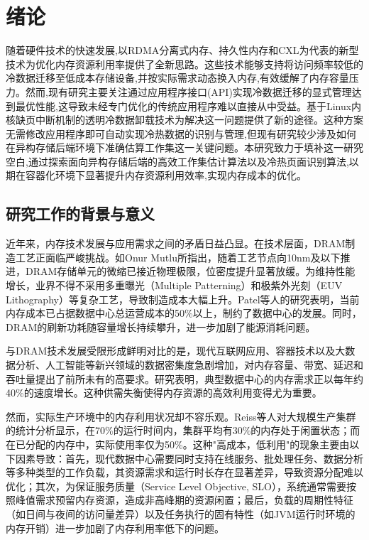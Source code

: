 \chapter{绪\hspace{6pt}论}

随着硬件技术的快速发展,以RDMA分离式内存、持久性内存和CXL为代表的新型技术为优化内存资源利用率提供了全新思路。这些技术能够支持将访问频率较低的冷数据迁移至低成本存储设备,并按实际需求动态换入内存,有效缓解了内存容量压力。然而,现有研究主要关注通过应用程序接口(API)实现冷数据迁移的显式管理达到最优性能,这导致未经专门优化的传统应用程序难以直接从中受益。基于Linux内核缺页中断机制的透明冷数据卸载技术为解决这一问题提供了新的途径。这种方案无需修改应用程序即可自动实现冷热数据的识别与管理,但现有研究较少涉及如何在异构存储后端环境下准确估算工作集这一关键问题。本研究致力于填补这一研究空白,通过探索面向异构存储后端的高效工作集估计算法以及冷热页面识别算法,以期在容器化环境下显著提升内存资源利用效率,实现内存成本的优化。

\section{研究工作的背景与意义}

近年来，内存技术发展与应用需求之间的矛盾日益凸显。在技术层面，DRAM制造工艺正面临严峻挑战。如Onur Mutlu所指出，随着工艺节点向10nm及以下推进，DRAM存储单元的微缩已接近物理极限，位密度提升显著放缓。为维持性能增长，业界不得不采用多重曝光（Multiple Patterning）和极紫外光刻（EUV Lithography）等复杂工艺，导致制造成本大幅上升。Patel等人的研究表明，当前内存成本已占据数据中心总运营成本的50\%以上，制约了数据中心的发展。同时，DRAM的刷新功耗随容量增长持续攀升，进一步加剧了能源消耗问题。

与DRAM技术发展受限形成鲜明对比的是，现代互联网应用、容器技术以及大数据分析、人工智能等新兴领域的数据密集度急剧增加，对内存容量、带宽、延迟和吞吐量提出了前所未有的高要求。研究表明，典型数据中心的内存需求正以每年约40\%的速度增长。这种供需失衡使得内存资源的高效利用变得尤为重要。

然而，实际生产环境中的内存利用状况却不容乐观。Reiss等人对大规模生产集群的统计分析显示，在70\%的运行时间内，集群平均有30\%的内存处于闲置状态；而在已分配的内存中，实际使用率仅为50\%。这种"高成本，低利用"的现象主要由以下因素导致：首先，现代数据中心需要同时支持在线服务、批处理任务、数据分析等多种类型的工作负载，其资源需求和运行时长存在显著差异，导致资源分配难以优化；其次，为保证服务质量（Service Level Objective, SLO），系统通常需要按照峰值需求预留内存资源，造成非高峰期的资源闲置；最后，负载的周期性特征（如日间与夜间的访问量差异）以及任务执行的固有特性（如JVM运行时环境的内存开销）进一步加剧了内存利用率低下的问题。

